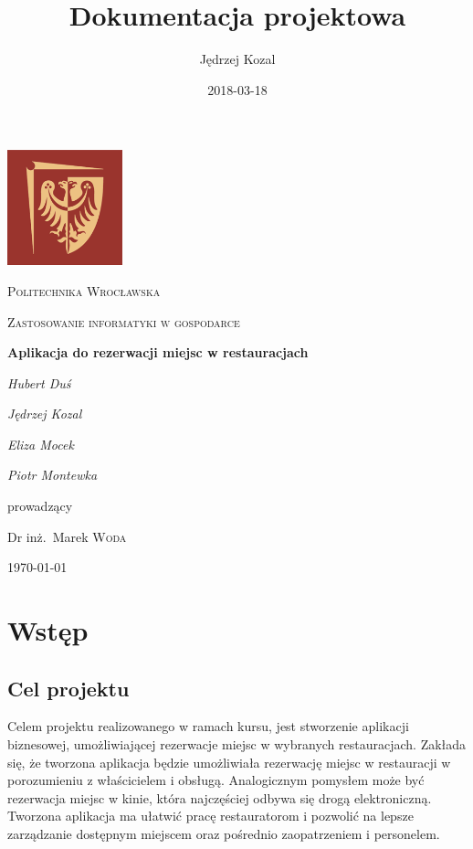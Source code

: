 \documentclass{article}
\title{Dokumentacja projektowa}
\date{2018-03-18}
\author{Jędrzej Kozal}
\begin{document}
\begin{titlepage}
	\centering
	\includegraphics[width=0.25\textwidth]{logo_pol_wroclaw.png}\par\vspace{1cm}
	{\scshape\LARGE Politechnika Wrocławska \par}
	\vspace{1cm}
	{\scshape\Large Zastosowanie informatyki w gospodarce\par}
	\vspace{1.5cm}
	{\huge\bfseries Aplikacja do rezerwacji miejsc w restauracjach \par}
	\vspace{2cm}
	{\Large\itshape Hubert Duś\par}
	{\Large\itshape Jędrzej Kozal\par}
	{\Large\itshape Eliza Mocek\par}
	{\Large\itshape Piotr Montewka\par}

	\vfill
	prowadzący\par
	Dr inż.~Marek \textsc{Woda}

	\vfill

	{\large \today\par}
\end{titlepage}

\tableofcontents
\newpage


\section{Wstęp}

\subsection{Cel projektu}
Celem projektu realizowanego w ramach kursu, jest stworzenie aplikacji biznesowej, umożliwiającej rezerwacje miejsc w wybranych restauracjach. Zakłada się, że tworzona aplikacja będzie umożliwiała rezerwację miejsc w restauracji w porozumieniu z właścicielem i obsługą. Analogicznym pomysłem może być rezerwacja miejsc w kinie, która najczęściej odbywa się drogą elektroniczną. Tworzona aplikacja ma ułatwić pracę restauratorom i pozwolić na lepsze zarządzanie dostępnym miejscem oraz pośrednio zaopatrzeniem i personelem.
\end{document}
